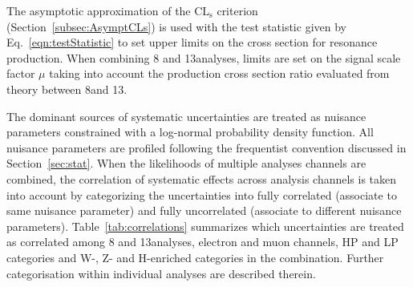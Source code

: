 The asymptotic approximation of the $\mathrm{CL_s}$ criterion (Section~\ref{subsec:AsymptCLs}) is used with the test statistic given by Eq.~\ref{eqn:testStatistic} to set upper limits on the cross section for resonance production.
When combining 8 and 13\TeV analyses, limits are set on the signal scale factor $\mu$ taking into account the production cross section ratio evaluated from theory between 8\TeV and 13\TeV.

The dominant sources of systematic uncertainties are treated as nuisance parameters constrained with a log-normal probability density function.
All nuisance parameters are profiled following the frequentist convention discussed in Section~\ref{sec:stat}.
When the likelihoods of multiple analyses channels are combined, the correlation of systematic effects across analysis channels is taken into account by categorizing the uncertainties into fully correlated (associate to same nuisance parameter) and fully uncorrelated (associate to different nuisance parameters).
Table~\ref{tab:correlations} summarizes which uncertainties are treated as correlated among 8 and 13\TeV analyses, electron and muon channels, HP and LP categories and W-, Z- and H-enriched categories in the combination.
Further categorisation within individual analyses are described therein.

